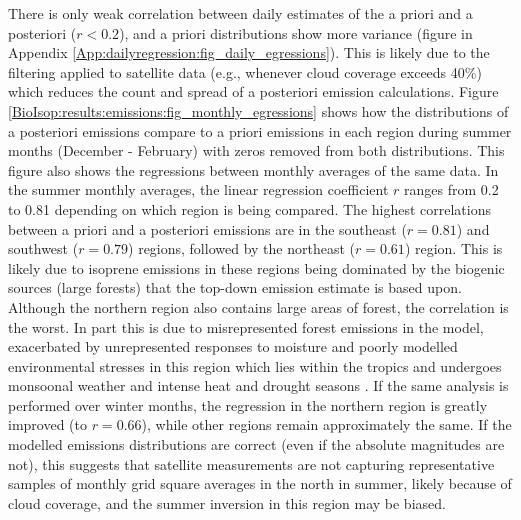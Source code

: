 \documentclass[acp, manuscript]{copernicus}
\newcommand{\parencite}{\citep}
\begin{document}
    There is only weak correlation between daily estimates of the a priori and a posteriori ($r < 0.2$), and a priori distributions show more variance (figure in Appendix \ref{App:dailyregression:fig_daily_egressions}).
    This is likely due to the filtering applied to satellite data (e.g., whenever cloud coverage exceeds 40\%) which reduces the count and spread of a posteriori emission calculations.
    Figure \ref{BioIsop:results:emissions:fig_monthly_egressions} shows how the distributions of a posteriori emissions compare to a priori emissions in each region during summer months (December - February) with zeros removed from both distributions. %
    This figure also shows the regressions between monthly averages of the same data. 
    In the summer monthly averages, the linear regression coefficient $r$ ranges from 0.2 to 0.81 depending on which region is being compared.
    The highest correlations between a priori and a posteriori emissions are in the southeast ($r=0.81$) and southwest ($r=0.79$) regions, followed by the northeast ($r=0.61$) region.
    This is likely due to isoprene emissions in these regions being dominated by the biogenic sources (large forests) that the top-down emission estimate is based upon.
    Although the northern region also contains large areas of forest, the correlation is the worst.
    In part this is due to misrepresented forest emissions in the model, exacerbated by unrepresented responses to moisture and poorly modelled environmental stresses in this region which lies within the tropics and undergoes monsoonal weather and intense heat and drought seasons \parencite[e.g.,][]{Emmerson2016,Surl2018,Emmerson2019}.
    If the same analysis is performed over winter months, the regression in the northern region is greatly improved (to $r=0.66$), while other regions remain approximately the same.
    If the modelled emissions distributions are correct (even if the absolute magnitudes are not), this suggests that satellite measurements are not capturing representative samples of monthly grid square averages in the north in summer, likely because of cloud coverage, and the summer inversion in this region may be biased.
    
\end{document}
